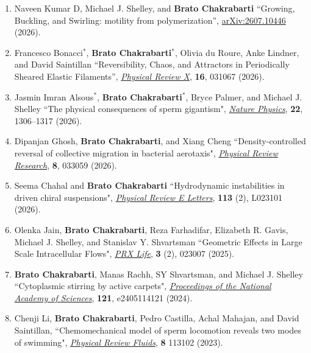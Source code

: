 \documentclass[10pt]{res} %
\begin{document}
\begin{resume}
\begin{enumerate}[topsep=0pt,itemsep= 1ex]
\item Naveen Kumar D,  Michael J. Shelley, and \textbf{Brato Chakrabarti} ``Growing, Buckling, and Swirling: motility from polymerization'', \href{https://arxiv.org/abs/2607.10446}{arXiv:2607.10446} (2026).
	
\item {Francesco Bonacci$^*$}, \textbf{Brato Chakrabarti$^*$}, Olivia du Roure, Anke Lindner, and {David Saintillan} ``Reversibility, Chaos, and Attractors in Periodically Sheared Elastic Filaments'', \href{https://doi.org/10.1103/84g7-fmcv}{\textit{Physical Review X}}, \textbf{16}, 031067 (2026).

\item  Jasmin Imran Alsous$^*$, \textbf{Brato Chakrabarti}$^*$, Bryce Palmer, and Michael J. Shelley ``The physical consequences of sperm gigantism", \href{https://doi.org/10.1038/s41567-026-03305-4}{\textit{Nature Physics}}, \textbf{22}, 1306--1317 (2026).

\item  Dipanjan Ghosh, \textbf{Brato Chakrabarti}, and Xiang Cheng ``Density-controlled reversal of collective migration in bacterial aerotaxis", \href{https://doi.org/10.1103/y7l1-288v}{\textit{Physical Review Research}}, \textbf{8}, 033059 (2026).
	
\item  Seema Chahal and \textbf{Brato Chakrabarti} ``Hydrodynamic instabilities in driven chiral suspensions", \href{https://doi.org/10.1103/9kfb-c51g}{\textit{Physical Review E Letters}}, \textbf{113} (2), L023101 (2026). 

\item  Olenka Jain, \textbf{Brato Chakrabarti}, Reza Farhadifar, Elizabeth R. Gavis, Michael J. Shelley, and Stanislav Y. Shvartsman ``Geometric Effects in Large Scale Intracellular Flows",  \href{https://doi.org/10.1103/PRXLife.3.023007}{\textit{PRX Life}}, \textbf{3} (2), 023007 (2025). 

	
\item  \textbf{Brato Chakrabarti}, Manas Rachh, SY Shvartsman, and  Michael J. Shelley ``Cytoplasmic stirring by active carpets",  \href{https://doi.org/10.1073/pnas.2405114121}{\textit{Proceedings of the National Academy of Sciences}},  \textbf{121}, e2405114121 (2024).
	
\item Chenji Li, \textbf{Brato Chakrabarti}, Pedro Castilla, Achal Mahajan, and David Saintillan, ``Chemomechanical model of sperm locomotion reveals two modes of swimming", \href{https://doi.org/10.1103/PhysRevFluids.8.113102}{\textit{Physical Review Fluids}}, \textbf{8} 113102 (2023). 
	

\end{enumerate}
\end{resume}
\end{document}
